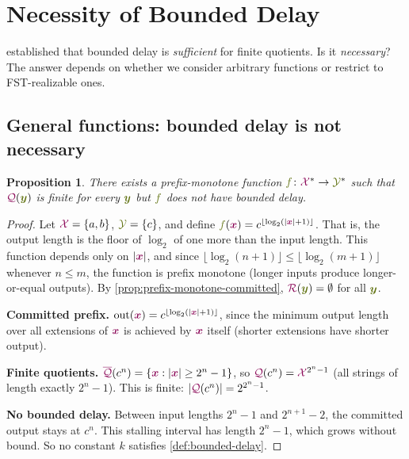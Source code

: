 \documentclass{article}
\newcommand{\maxQuotient}{{\color{TokenColor}\overline{\mathcal{Q}}}}
\newcommand{\Quotient}{{\color{TokenColor}\mathcal{Q}}}
\newcommand{\Remainder}{{\color{TokenColor}\mathcal{R}}}
\newcommand{\transFnSym}[0]{f}
\newcommand{\transFn}{\ensuremath{{\color{CharacterColor}\transFnSym}}\xspace}
\newcommand{\srcStr}{\ensuremath{{\color{TokenColor}\boldsymbol{x}}}\xspace}
\newcommand{\tgtStr}{{\color{CharacterColor}\boldsymbol{y}}}
\newcommand{\srcAlphabet}[0]{{\color{TokenColor}\ensuremath{\mathcal{X}}}\xspace}
\newcommand{\tgtAlphabet}[0]{{\color{CharacterColor}\ensuremath{\mathcal{Y}}}\xspace}
\newcommand{\srcStrings}[0]{\ensuremath{\srcAlphabet^*}\xspace}
\newcommand{\tgtStrings}[0]{\ensuremath{\tgtAlphabet^*}\xspace}
\newcommand{\committed}{\mathrm{out}}
\theoremstyle{plain}
\newtheorem{proposition}[theorem]{Proposition}
\theoremstyle{definition}
\theoremstyle{remark}
\begin{document}
\section{Necessity of Bounded Delay}
\label{sec:necessity}

 established that bounded delay is \emph{sufficient} for finite
quotients.  Is it \emph{necessary}?  The answer depends on whether we consider
arbitrary functions or restrict to FST-realizable ones.

\subsection{General functions: bounded delay is not necessary}

\begin{proposition}
\label{prop:not-necessary-general}
There exists a prefix-monotone function $\transFn \colon \srcStrings \to
\tgtStrings$ such that $\Quotient(\tgtStr)$ is finite for every $\tgtStr$ but
$\transFn$ does not have bounded delay.
\end{proposition}
\begin{proof}
Let $\srcAlphabet = \{a, b\}$, $\tgtAlphabet = \{c\}$, and define
$\transFn(\srcStr) = c^{\lfloor \log_2(|\srcStr| + 1) \rfloor}$.  That is,
the output length is the floor of $\log_2$ of one more than the input length.
This function depends only on $|\srcStr|$, and since $\lfloor \log_2(n+1)
\rfloor \leq \lfloor \log_2(m+1) \rfloor$ whenever $n \leq m$, the function
is prefix monotone (longer inputs produce longer-or-equal outputs).  By
\cref{prop:prefix-monotone-committed}, $\Remainder(\tgtStr) = \emptyset$ for
all $\tgtStr$.

\medskip\noindent\textbf{Committed prefix.}
$\committed(\srcStr) = c^{\lfloor \log_2(|\srcStr| + 1) \rfloor}$, since the
minimum output length over all extensions of $\srcStr$ is achieved by $\srcStr$
itself (shorter extensions have shorter output).

\medskip\noindent\textbf{Finite quotients.}
$\maxQuotient(c^n) = \{ \srcStr : |\srcStr| \geq 2^n - 1 \}$, so
$\Quotient(c^n) = \srcAlphabet^{2^n - 1}$ (all strings of length exactly
$2^n - 1$).  This is finite: $|\Quotient(c^n)| = 2^{2^n - 1}$.

\medskip\noindent\textbf{No bounded delay.}
Between input lengths $2^n - 1$ and $2^{n+1} - 2$, the committed output stays
at $c^n$.  This stalling interval has length $2^n - 1$, which grows without
bound.  So no constant $k$ satisfies \cref{def:bounded-delay}.
\end{proof}
\end{document}
